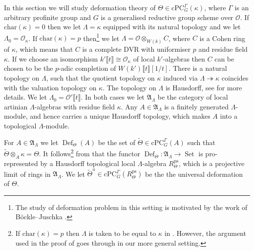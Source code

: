 \documentclass{amsart}
\theoremstyle{definition}
\theoremstyle{remark}
\DeclareMathOperator{\Def}{Def}
\DeclareMathOperator{\Set}{Set}
\newcommand{\Aa}{\mathfrak A}
\newcommand{\OO}{\mathcal O}
\newcommand{\br}[1]{\llbracket #1\rrbracket}
\newcommand{\chara}{\mathrm{char}}
\newcommand{\cPC}{\mathrm{cPC}}
\newcommand{\ps}{\mathrm{ps}}
\newcommand{\wTheta}{\widetilde{\Theta}}
\begin{document}
In this section we will study deformation theory of $\Theta\in \cPC^{\Gamma}_G(\kappa)$, where  $\Gamma$ is an arbitrary profinite group and $G$ is a
generalised reductive group scheme over $\OO$.  If $\chara(\kappa)=0$ then we let $\Lambda=\kappa$ equipped with its natural topology and we let $\Lambda_0=\OO_{\kappa}$. 
If $\chara(\kappa)=p$ then\footnote{The study of deformation problem in this setting is motivated by the work of B\"ockle--Juschka \cite[Section 4.7]{BJ_new}.} we let $\Lambda= \OO\otimes_{W(k)} C$, where $C$ 
is a Cohen ring of $\kappa$, which means that $C$ is a complete DVR with 
uniformiser $p$ and residue field $\kappa$. If we choose an isomorphism 
$k'\br{t}\cong \OO_{\kappa}$ of local $k'$-algebras then $C$ can 
be chosen to be the $p$-adic completion of $W(k')\br{t}[1/t]$. There is a natural topology on $\Lambda$, such that the quotient topology on $\kappa$ induced via  $\Lambda \twoheadrightarrow \kappa$ coincides with the valuation 
topology on $\kappa$. The topology on $\Lambda$ is Hausdorff, see \cite[Section 3.5]{BIP_new} for more details. We let $\Lambda_0=\OO'\br{t}$. In both cases we let $\Aa_{\Lambda}$ be the 
category of local artinian $\Lambda$-algebras with residue field $\kappa$. 
Any $A\in \Aa_{\Lambda}$ is a finitely generated $\Lambda$-module, and 
hence carries a unique Hausdorff topology, which makes  $A$ into a topological $\Lambda$-module. 

For $A\in \Aa_{\Lambda}$ we let $\Def_{\Theta}(A)$ be the set of 
$\wTheta\in \cPC^{\Gamma}_G(A)$ such that $\wTheta\otimes_{A} \kappa = \Theta$. 
It follows\footnote{If $\chara(\kappa)=p$ then $\Lambda$ is taken to be equal to $\kappa$
in \cite{quast}. However,  the argument used in the  proof of \cite[Theorem 5.4]{quast} goes through in our more general setting.} from \cite[Theorem 5.4]{quast} that the functor $\Def_{\Theta}: \Aa_{\Lambda}\rightarrow \Set$ is pro-represented by a Hausdorff topological local $\Lambda$-algebra $R^{\ps}_{\Theta}$, which is a projective limit of rings in $\Aa_{\Lambda}$. We let $\wTheta^u\in \cPC^{\Gamma}_G(R^{\ps}_{\Theta})$ be the the universal 
deformation of $\Theta$.
\end{document}
